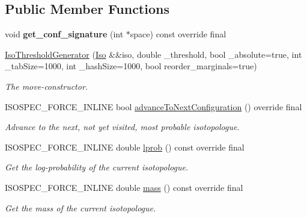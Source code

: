 \subsection*{Public Member Functions}
\begin{DoxyCompactItemize}
\item 
\mbox{\label{class_iso_spec_1_1_iso_threshold_generator_a58699c4e68a846b979b8163bc6982e2c}} 
void {\bfseries get\+\_\+conf\+\_\+signature} (int $\ast$space) const override final
\item 
\mbox{\hyperlink{class_iso_spec_1_1_iso_threshold_generator_a3abbcf1d810b6cad9400bd2552c3faf1}{Iso\+Threshold\+Generator}} (\mbox{\hyperlink{class_iso_spec_1_1_iso}{Iso}} \&\&iso, double \+\_\+threshold, bool \+\_\+absolute=true, int \+\_\+tab\+Size=1000, int \+\_\+hash\+Size=1000, bool reorder\+\_\+marginals=true)
\begin{DoxyCompactList}\small\item\em The move-\/constructor. \end{DoxyCompactList}\item 
I\+S\+O\+S\+P\+E\+C\+\_\+\+F\+O\+R\+C\+E\+\_\+\+I\+N\+L\+I\+NE bool \mbox{\hyperlink{class_iso_spec_1_1_iso_threshold_generator_a7164a6476b84665967c4a667a91d3f3e}{advance\+To\+Next\+Configuration}} () override final
\begin{DoxyCompactList}\small\item\em Advance to the next, not yet visited, most probable isotopologue. \end{DoxyCompactList}\item 
I\+S\+O\+S\+P\+E\+C\+\_\+\+F\+O\+R\+C\+E\+\_\+\+I\+N\+L\+I\+NE double \mbox{\hyperlink{class_iso_spec_1_1_iso_threshold_generator_a4aeebde03e385404d0175fd5696ff529}{lprob}} () const override final
\begin{DoxyCompactList}\small\item\em Get the log-\/probability of the current isotopologue. \end{DoxyCompactList}\item 
I\+S\+O\+S\+P\+E\+C\+\_\+\+F\+O\+R\+C\+E\+\_\+\+I\+N\+L\+I\+NE double \mbox{\hyperlink{class_iso_spec_1_1_iso_threshold_generator_ae2236accc7dc7a25a723e3c7317659b6}{mass}} () const override final
\begin{DoxyCompactList}\small\item\em Get the mass of the current isotopologue. \end{DoxyCompactList}\item 

\end{DoxyCompactItemize}
